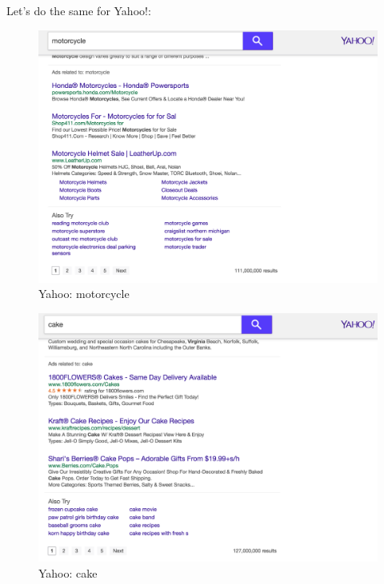 \documentclass[10pt,letterpaper,bibliography=totoc]{scrartcl}
\begin{document}
Let's do the same for Yahoo!:
\begin{figure}
\centering
\label{fig:motorcycleYahoo}
\includegraphics[scale=.3]{motorcycle_yahoo.png}
\caption{Yahoo: motorcycle}
\end{figure}
\begin{figure}
\centering
\label{fig:cakeYahoo}
\includegraphics[scale=.3]{cake_yahoo.png}
\caption{Yahoo: cake}
\end{figure}
\end{document}
